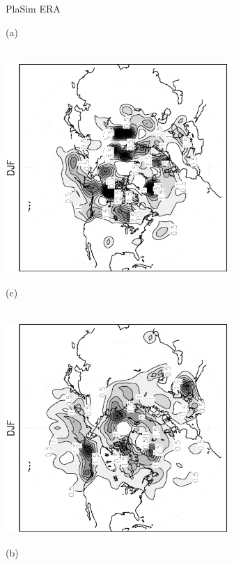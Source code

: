 \documentclass[12pt,a4paper,twoside,openright,headinclude,liststotoc,bibtotoc]{scrreprt}
\begin{document}
\begin{appendix}
\begin{figure}[b]
\hspace{3.8cm}PlaSim \vspace{0.2cm} \hspace{7.3cm} ERA \\
\parbox{8.5cm}{\hspace{0.95cm}\begin{scriptsize}(a)\end{scriptsize} \vspace{-0.5cm} \\
\includegraphics[height=8.0cm,angle=-90]
{eps/cycllys_PLASIM_T21_45DJF.eps}
}
\parbox{8.5cm}{\hspace{0.95cm}\begin{scriptsize}(c)\end{scriptsize} \vspace{-0.5cm} \\
\includegraphics[height=8.0cm,angle=-90]
{eps/cycllys_ERA40_T21_45DJF.eps}
}
\parbox{8.5cm}{\hspace{0.95cm}\begin{scriptsize}(b)\end{scriptsize} \vspace{-0.5cm} \\
}
\end{figure}
\end{appendix}
\end{document}
